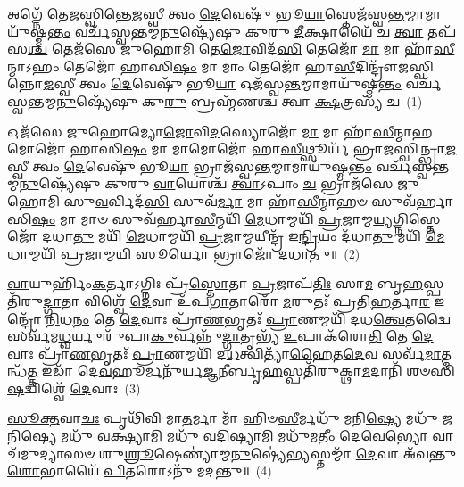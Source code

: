 \setcounter{anuvakam}{0}
𑌅𑌗𑍍𑌨𑍇᳴ 𑌤𑍇𑌜𑌸𑍍𑌵𑌿𑌨𑍍𑌤𑍇\-\ul{𑌜}\-𑌸𑍍𑌵𑍀 𑌤𑍍𑌵𑌂 \ul{𑌦𑍇}\-𑌵𑍇𑌷𑍁᳴ 𑌭𑍂\-\ul{𑌯𑌾}\-𑌸𑍍𑌤𑍇𑌜᳴𑌸𑍍𑌵\-\ul{𑌨𑍍𑌤}\-𑌮𑍍𑌮𑌾𑌮𑌾𑌯𑍁᳴𑌷𑍍𑌮\-\ul{𑌨𑍍𑌤𑌂} 𑌵𑌰𑍍𑌚᳴𑌸𑍍𑌵𑌨𑍍𑌤𑌮𑍍𑌮\-\ul{𑌨𑍁}\-𑌷𑍍𑌯𑍇᳴𑌷𑍁 𑌕𑍁𑌰𑍁 \ul{𑌦𑍀}\-𑌕𑍍𑌷𑌾𑌯𑍈᳴ 𑌚 \ul{𑌤𑍍𑌵𑌾} 𑌤𑌪᳴𑌸\-\ul{𑌶𑍍𑌚} 𑌤𑍇𑌜᳴𑌸𑍇 𑌜𑍁𑌹𑍋𑌮𑌿 𑌤𑍇\-\ul{𑌜𑍋}\-𑌵𑌿𑌦᳴\-\ul{𑌸𑌿} 𑌤𑍇𑌜𑍋᳴ \ul{𑌮𑌾} 𑌮𑌾 𑌹𑌾᳴\-\ul{𑌸𑍀}\-𑌨𑍍𑌮𑌾\-𑌽𑌹𑌂 𑌤𑍇𑌜𑍋᳴ 𑌹𑌾𑌸𑌿\-\ul{𑌷𑌂} 𑌮𑌾 𑌮𑌾𑌂 𑌤𑍇𑌜𑍋᳴ 𑌹𑌾\-\ul{𑌸𑍀}\-𑌦𑌿𑌨𑍍𑌦𑍍𑌰𑍗᳴𑌜𑌸𑍍𑌵𑌿𑌨𑍍𑌨𑍋\-\ul{𑌜}\-𑌸𑍍𑌵𑍀 𑌤𑍍𑌵𑌂 \ul{𑌦𑍇}\-𑌵𑍇𑌷𑍁᳴ 𑌭𑍂\-\ul{𑌯𑌾} 𑌓𑌜᳴𑌸𑍍𑌵\-\ul{𑌨𑍍𑌤}\-𑌮𑍍𑌮𑌾𑌮𑌾𑌯𑍁᳴𑌷𑍍𑌮\-\ul{𑌨𑍍𑌤𑌂} 𑌵𑌰𑍍𑌚᳴𑌸𑍍𑌵𑌨𑍍𑌤𑌮𑍍𑌮\-\ul{𑌨𑍁}\-𑌷𑍍𑌯𑍇᳴𑌷𑍁 𑌕𑍁\-\ul{𑌰𑍁} 𑌬𑍍𑌰𑌹𑍍𑌮᳴𑌣𑌶𑍍𑌚 𑌤𑍍𑌵𑌾 \ul{𑌕𑍍𑌷}\-𑌤𑍍𑌰𑌸𑍍𑌯᳴ 𑌚~(1)

𑌓𑌜᳴𑌸𑍇 𑌜𑍁𑌹𑍋𑌮𑍍𑌯𑍋\-\ul{𑌜𑍋}\-𑌵𑌿\-\ul{𑌦}\-𑌸𑍍𑌯𑍋𑌜𑍋᳴ \ul{𑌮𑌾} 𑌮𑌾 𑌹𑌾᳴\-\ul{𑌸𑍀}\-𑌨𑍍𑌮𑌾𑌹𑌮𑍋𑌜𑍋᳴ 𑌹𑌾𑌸𑌿\-\ul{𑌷𑌂} 𑌮𑌾 𑌮𑌾𑌮𑍋𑌜𑍋᳴ 𑌹𑌾\-\ul{𑌸𑍀}\-𑌥𑍍𑌸𑍂𑌰𑍍𑌯᳴ 𑌭𑍍𑌰𑌾𑌜𑌸𑍍𑌵𑌿𑌨𑍍𑌭𑍍𑌰𑌾\-\ul{𑌜}\-𑌸𑍍𑌵𑍀 𑌤𑍍𑌵𑌂 \ul{𑌦𑍇}\-𑌵𑍇𑌷𑍁᳴ 𑌭𑍂\-\ul{𑌯𑌾} 𑌭𑍍𑌰𑌾𑌜᳴𑌸𑍍𑌵\-\ul{𑌨𑍍𑌤}\-𑌮𑍍𑌮𑌾𑌮𑌾𑌯𑍁᳴𑌷𑍍𑌮\-\ul{𑌨𑍍𑌤𑌂} 𑌵𑌰𑍍𑌚᳴𑌸𑍍𑌵𑌨𑍍𑌤𑌮𑍍𑌮\-\ul{𑌨𑍁}\-𑌷𑍍𑌯𑍇᳴𑌷𑍁 𑌕𑍁𑌰𑍁 \ul{𑌵𑌾}\-𑌯𑍋𑌶𑍍𑌚᳴ \ul{𑌤𑍍𑌵𑌾}\-\-𑌽𑌪𑌾𑌂 \ul{𑌚} 𑌭𑍍𑌰𑌾𑌜᳴𑌸𑍇 𑌜𑍁𑌹𑍋𑌮𑌿 𑌸𑍁\-\ul{𑌵}\-𑌰𑍍𑌵𑌿𑌦᳴\-\ul{𑌸𑌿} 𑌸𑍁𑌵᳴\-\ul{𑌰𑍍𑌮𑌾} 𑌮𑌾 𑌹𑌾᳴\-\ul{𑌸𑍀}\-𑌨𑍍𑌮𑌾𑌹𑍞 𑌸𑍁𑌵᳴𑌰𑍍\mbox{}𑌹𑌾𑌸𑌿\-\ul{𑌷𑌂} 𑌮𑌾 𑌮𑌾𑍞 𑌸𑍁𑌵᳴𑌰𑍍\mbox{}𑌹𑌾\-\ul{𑌸𑍀}\-𑌨𑍍𑌮𑌯𑌿᳴ \ul{𑌮𑍇}\-𑌧𑌾𑌮𑍍𑌮𑌯𑌿᳴ \ul{𑌪𑍍𑌰}\-𑌜𑌾𑌮𑍍𑌮\-\ul{𑌯𑍍𑌯}\-𑌗𑍍𑌨𑌿𑌸𑍍𑌤𑍇𑌜𑍋᳴ 𑌦𑌧𑌾\-\ul{𑌤𑍁} 𑌮𑌯𑌿᳴ \ul{𑌮𑍇}\-𑌧𑌾𑌮𑍍𑌮𑌯𑌿᳴ \ul{𑌪𑍍𑌰}\-𑌜𑌾𑌮𑍍𑌮𑌯𑍀𑌨𑍍𑌦𑍍𑌰᳴ 𑌇\-\ul{𑌨𑍍𑌦𑍍𑌰𑌿}\-𑌯𑌂 𑌦᳴𑌧𑌾\-\ul{𑌤𑍁} 𑌮𑌯𑌿᳴ \ul{𑌮𑍇}\-𑌧𑌾𑌮𑍍𑌮𑌯𑌿᳴ \ul{𑌪𑍍𑌰}\-𑌜𑌾𑌮𑍍𑌮\-\ul{𑌯𑌿} 𑌸𑍂\-\ul{𑌰𑍍𑌯𑍋} 𑌭𑍍𑌰𑌾𑌜𑍋᳴ 𑌦𑌧𑌾𑌤𑍁॥~(2)

{\anuvakamend[{\-\ul{𑌕𑍍𑌷}\-𑌤𑍍𑌰𑌸𑍍𑌯᳴ \ul{𑌚} 𑌮\-\ul{𑌯𑌿} 𑌤𑍍𑌰𑌯𑍋᳴𑌵𑌿𑍞𑌶𑌤𑌿𑌶𑍍𑌚}]}%

\-\ul{𑌵𑌾}\-𑌯𑍁𑌰𑍍\mbox{}𑌹𑌿𑌂᳴\-\ul{𑌕}\-𑌰𑍍𑌤𑌾\-𑌽𑌗𑍍𑌨𑌿𑌃 𑌪𑍍𑌰᳴\-\ul{𑌸𑍍𑌤𑍋}\-𑌤𑌾 \ul{𑌪𑍍𑌰}\-𑌜𑌾𑌪᳴\-\ul{𑌤𑌿𑌃} 𑌸𑌾\-\ul{𑌮} 𑌬𑍃\-\ul{𑌹}\-𑌸𑍍𑌪𑌤𑌿᳴𑌰𑍁\-\ul{𑌦𑍍𑌗𑌾}\-𑌤𑌾 𑌵𑌿𑌶𑍍𑌵𑍇᳴ \ul{𑌦𑍇}\-𑌵𑌾 𑌉᳴𑌪\-\ul{𑌗𑌾}\-𑌤𑌾𑌰𑍋᳴ \ul{𑌮}\-𑌰𑍁𑌤𑌃᳴ 𑌪𑍍𑌰𑌤𑌿\-\ul{𑌹}\-𑌰𑍍𑌤𑌾\-\ul{𑌰} 𑌇𑌨𑍍𑌦𑍍𑌰𑍋᳴ \ul{𑌨𑌿}\-𑌧\-\ul{𑌨𑌂} 𑌤𑍇 \ul{𑌦𑍇}\-𑌵𑌾𑌃 𑌪𑍍𑌰𑌾᳴\-\ul{𑌣}\-𑌭𑍃𑌤𑌃᳴ \ul{𑌪𑍍𑌰𑌾}\-𑌣𑌮𑍍𑌮𑌯𑌿᳴ 𑌦𑌧\-\ul{𑌤𑍍𑌵𑍇}\-𑌤𑌦𑍍𑌵𑍈 𑌸𑌰𑍍𑌵᳴𑌮\-\ul{𑌧𑍍𑌵}\-𑌰𑍍𑌯𑍁𑌰𑍁᳴𑌪𑌾\-\ul{𑌕𑍁}\-𑌰𑍍𑌵𑌨𑍍𑌨𑍁᳴\-\ul{𑌦𑍍𑌗𑌾}\-𑌤𑍃𑌭𑍍𑌯᳴ \ul{𑌉}\-𑌪𑌾𑌕᳴𑌰𑍋\-\ul{𑌤𑌿} 𑌤𑍇 \ul{𑌦𑍇}\-𑌵𑌾𑌃 𑌪𑍍𑌰𑌾᳴\-\ul{𑌣}\-𑌭𑍃𑌤𑌃᳴ \ul{𑌪𑍍𑌰𑌾}\-𑌣𑌮𑍍𑌮𑌯𑌿᳴ 𑌦\-\ul{𑌧}\-𑌤𑍍𑌵𑌿𑌤𑍍𑌯𑌾᳴\-\ul{𑌹𑍈}\-𑌤\-\ul{𑌦𑍇}\-𑌵 𑌸𑌰𑍍𑌵᳴\-\ul{𑌮𑌾}\-𑌤𑍍𑌮𑌨𑍍𑌧᳴\-\ul{𑌤𑍍𑌤} 𑌇𑌡𑌾᳴ 𑌦𑍇\-\ul{𑌵}\-𑌹𑍂𑌰𑍍𑌮𑌨𑍁᳴𑌰𑍍𑌯\-\ul{𑌜𑍍𑌞}\-𑌨𑍀𑌰𑍍𑌬𑍃\-\ul{𑌹}\-𑌸𑍍𑌪𑌤𑌿᳴𑌰𑍁𑌕𑍍𑌥𑌾\-\ul{𑌮}\-𑌦𑌾𑌨𑌿᳴ 𑌶𑍞𑌸𑌿\-\ul{𑌷}\-𑌦𑍍𑌵𑌿𑌶𑍍𑌵𑍇᳴ \ul{𑌦𑍇}\-𑌵𑌾𑌃~(3)

\-\ul{𑌸𑍂}\-\-\ul{𑌕𑍍𑌤}\-𑌵𑌾\-\ul{𑌚𑌃} 𑌪𑍃𑌥𑌿᳴𑌵𑌿 𑌮𑌾\-\ul{𑌤}\-𑌰𑍍𑌮𑌾 𑌮𑌾᳴ 𑌹𑌿𑍞\-\ul{𑌸𑍀}\-𑌰𑍍𑌮𑌧𑍁᳴ 𑌮𑌨𑌿\-\ul{𑌷𑍍𑌯𑍇} 𑌮𑌧𑍁᳴ 𑌜𑌨𑌿\-\ul{𑌷𑍍𑌯𑍇} 𑌮𑌧𑍁᳴ 𑌵𑌕𑍍𑌷𑍍𑌯𑌾\-\ul{𑌮𑌿} 𑌮𑌧𑍁᳴ 𑌵𑌦𑌿𑌷𑍍𑌯𑌾\-\ul{𑌮𑌿} 𑌮𑌧𑍁᳴𑌮𑌤𑍀𑌂 \ul{𑌦𑍇}\-𑌵𑍇\-\ul{𑌭𑍍𑌯𑍋} 𑌵𑌾𑌚᳴𑌮𑍁𑌦𑍍𑌯𑌾𑌸𑍞 𑌶𑍁\-\ul{𑌶𑍍𑌰𑍂}\-𑌷𑍇𑌣𑍍𑌯𑌾॑𑌮𑍍𑌮\-\ul{𑌨𑍁}\-𑌷𑍍𑌯𑍇॑\-\ul{𑌭𑍍𑌯}\-𑌸𑍍𑌤𑌮𑍍𑌮𑌾᳴ \ul{𑌦𑍇}\-𑌵𑌾 𑌅᳴𑌵𑌨𑍍𑌤𑍁 \ul{𑌶𑍋}\-𑌭𑌾𑌯𑍈᳴ \ul{𑌪𑌿}\-𑌤𑌰𑍋\-𑌽𑌨𑍁᳴ 𑌮𑌦𑌨𑍍𑌤𑍁॥~(4)

